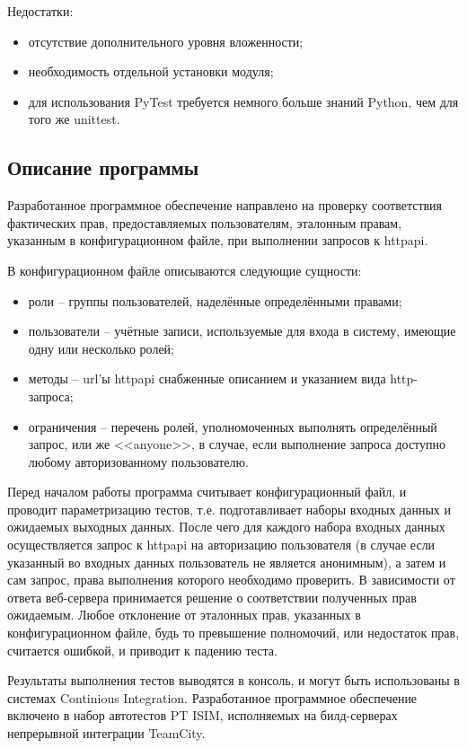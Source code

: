 Недостатки:
\begin{itemize}
    \item отсутствие дополнительного уровня вложенности;
    \item необходимость отдельной установки модуля;
    \item для использования PyTest требуется немного больше знаний Python, чем для того же unittest.\\
\end{itemize}

\subsection{Описание программы}

Разработанное программное обеспечение направлено на проверку соответствия фактических прав, предоставляемых пользователям, эталонным правам, указанным в конфигурационном файле, при выполнении запросов к httpapi.\par

В конфигурационном файле описываются следующие сущности:
\begin{itemize}
    \item роли -- группы пользователей, наделённые определёнными правами;
    \item пользователи -- учётные записи, используемые для входа в систему, имеющие одну или несколько ролей;
    \item методы -- url'ы httpapi снабженные описанием и указанием вида http-запроса;
    \item ограничения -- перечень ролей, уполномоченных выполнять определённый запрос, или же <<anyone>>, в случае, если выполнение запроса доступно любому авторизованному пользователю.
\end{itemize}

Перед началом работы программа считывает конфигурационный файл, и проводит параметризацию тестов, т.е. подготавливает наборы входных данных и ожидаемых выходных данных. После чего для каждого набора входных данных осуществляется запрос к httpapi на авторизацию пользователя (в случае если указанный во входных данных пользователь не является анонимным), а затем и сам запрос, права выполнения которого необходимо проверить. В зависимости от ответа веб-сервера принимается решение о соответствии полученных прав ожидаемым. Любое отклонение от эталонных прав, указанных в конфигурационном файле, будь то превышение полномочий, или недостаток прав, считается ошибкой, и приводит к падению теста.\par

Результаты выполнения тестов выводятся в консоль, и могут быть использованы в системах Continious Integration. Разработанное программное обеспечение включено в набор автотестов PT ISIM, исполняемых на билд-серверах непрерывной интеграции TeamCity.\\

